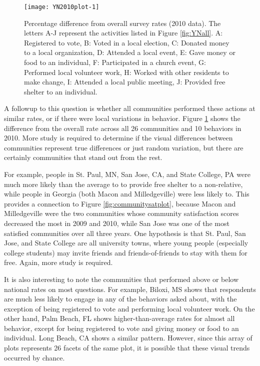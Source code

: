 \documentclass[smallextended]{svjour3}\usepackage[]{graphicx}\usepackage[]{color}
\newenvironment{knitrout}{}{} %
\begin{document}
\begin{knitrout}
\color{fgcolor}\begin{figure}

{\centering \texttt{[image: YN2010plot-1]} 

}

\caption{Percentage difference from overall survey rates (2010 data). The letters A-J represent the activities listed in Figure \ref{fig:YNall}. A: Registered to vote, B: Voted in a local election, C: Donated money to a local organization, D: Attended a local event, E: Gave money or food to an individual, F: Participated in a church event, G: Performed local volunteer work, H: Worked with other residents to make change, I: Attended a local public meeting, J: Provided free shelter to an individual.}\label{fig:YN2010plot}
\end{figure}


\end{knitrout}

A followup to this question is whether all communities performed these actions at similar rates, or if there were local variations in behavior. Figure \ref{fig:YN2010plot} shows the difference from the overall rate across all 26 communities and 10 behaviors in 2010. More study is required to determine if the visual differences between communities represent true differences or just random variation, but there are certainly communities that stand out from the rest. 

For example, people in St. Paul, MN, San Jose, CA, and State College, PA were much more likely than the average to to provide free shelter to a non-relative, while people in Georgia (both Macon and Milledgeville) were less likely to. This provides a connection to Figure \ref{fig:communitysatplot}, because Macon and Milledgeville were the two communities whose community satisfaction scores decreased the most in 2009 and 2010, while San Jose was one of the most satisfied communities over all three years. One hypothesis is that St. Paul, San Jose, and State College are all university towns, where young people (especially college students) may invite friends and friends-of-friends to stay with them for free. Again, more study is required. 

It is also interesting to note the communities that performed above or below national rates on most questions. For example, Biloxi, MS shows that respondents are much less likely to engage in any of the behaviors asked about, with the exception of being registered to vote and performing local volunteer work. On the other hand, Palm Beach, FL shows higher-than-average rates for almost all behavior, except for being registered to vote and giving money or food to an individual. Long Beach, CA shows a similar pattern. However, since this array of plots represents 26 facets of the same plot, it is possible that these visual trends occurred by chance. 
\end{document}
